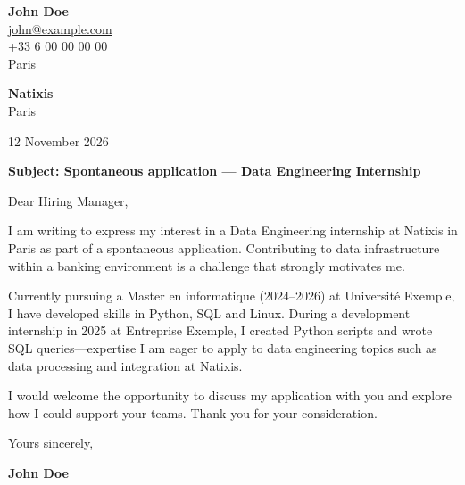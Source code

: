 \documentclass[11pt,a4paper]{article}
\begin{document}
{\Large\bfseries John Doe}\\[0.3cm]


\href{mailto:john@example.com}{john@example.com}\\



+33 6 00 00 00 00\\



Paris\\


\vspace{1cm}

\begin{flushright}

\textbf{Natixis}\\



Paris\\


\vspace{0.5cm}

12 November 2026

\end{flushright}

\vspace{0.8cm}

\textbf{Subject: Spontaneous application — Data Engineering Internship}

\vspace{0.6cm}


Dear Hiring Manager,


\vspace{0.5cm}

\justifying


I am writing to express my interest in a Data Engineering internship at Natixis in Paris as part of a spontaneous application. Contributing to data infrastructure within a banking environment is a challenge that strongly motivates me.

\par

Currently pursuing a Master en informatique (2024–2026) at Université Exemple, I have developed skills in Python, SQL and Linux. During a development internship in 2025 at Entreprise Exemple, I created Python scripts and wrote SQL queries—expertise I am eager to apply to data engineering topics such as data processing and integration at Natixis.

\par

I would welcome the opportunity to discuss my application with you and explore how I could support your teams. Thank you for your consideration.

\par


\vspace{0.7cm}


Yours sincerely,


\vspace{0.5cm}

\textbf{John Doe}
\end{document}
